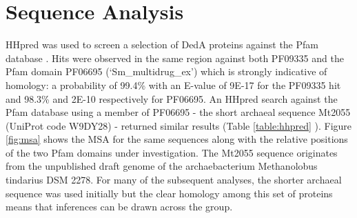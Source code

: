 \section{Sequence Analysis}
HHpred \cite{Zimmermann2018} was used to screen a selection of DedA proteins against the Pfam database \cite{El-Gebali2019}. Hits were observed in the same region against both PF09335 and the Pfam domain PF06695 (‘Sm{\_}multidrug{\_}ex’) which is strongly indicative of homology: a probability of 99.4\% with an E-value of 9E-17 for the PF09335 hit and 98.3\% and 2E-10 respectively for PF06695. An HHpred search against the Pfam database using a member of PF06695 - the short archaeal sequence Mt2055 (UniProt code W9DY28) \cite{Apweiler2004} - returned similar results (Table \ref{table:hhpred} ). Figure \ref{fig:msa} shows the MSA for the same sequences along with the relative positions of the two Pfam domains under investigation.  The Mt2055 sequence originates from the unpublished draft genome of the archaebacterium Methanolobus tindarius DSM 2278.  For many of the subsequent analyses, the shorter archaeal sequence was used initially but the clear homology among this set of proteins means that inferences can be drawn across the group.

